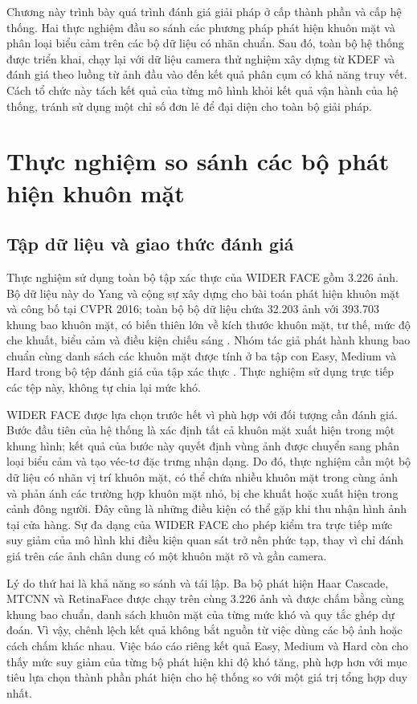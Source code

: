 \documentclass[../LuanVan.tex]{subfiles}
\begin{document}
Chương này trình bày quá trình đánh giá giải pháp ở cấp thành phần và cấp hệ thống. Hai thực nghiệm đầu so sánh các phương pháp phát hiện khuôn mặt và phân loại biểu cảm trên các bộ dữ liệu có nhãn chuẩn. Sau đó, toàn bộ hệ thống được triển khai, chạy lại với dữ liệu camera thử nghiệm xây dựng từ KDEF và đánh giá theo luồng từ ảnh đầu vào đến kết quả phân cụm có khả năng truy vết. Cách tổ chức này tách kết quả của từng mô hình khỏi kết quả vận hành của hệ thống, tránh sử dụng một chỉ số đơn lẻ để đại diện cho toàn bộ giải pháp.

\section{Thực nghiệm so sánh các bộ phát hiện khuôn mặt}
\label{section:5.1}

\subsection{Tập dữ liệu và giao thức đánh giá}
\label{subsection:5.1.1}

Thực nghiệm sử dụng toàn bộ tập xác thực của WIDER FACE gồm 3.226 ảnh. Bộ dữ liệu này do Yang và cộng sự xây dựng cho bài toán phát hiện khuôn mặt và công bố tại CVPR 2016; toàn bộ bộ dữ liệu chứa 32.203 ảnh với 393.703 khung bao khuôn mặt, có biến thiên lớn về kích thước khuôn mặt, tư thế, mức độ che khuất, biểu cảm và điều kiện chiếu sáng \cite{yang2016wider}. Nhóm tác giả phát hành khung bao chuẩn cùng danh sách các khuôn mặt được tính ở ba tập con Easy, Medium và Hard trong bộ tệp đánh giá của tập xác thực \cite{widerFaceEvaluation}. Thực nghiệm sử dụng trực tiếp các tệp này, không tự chia lại mức khó.

WIDER FACE được lựa chọn trước hết vì phù hợp với đối tượng cần đánh giá. Bước đầu tiên của hệ thống là xác định tất cả khuôn mặt xuất hiện trong một khung hình; kết quả của bước này quyết định vùng ảnh được chuyển sang phân loại biểu cảm và tạo véc-tơ đặc trưng nhận dạng. Do đó, thực nghiệm cần một bộ dữ liệu có nhãn vị trí khuôn mặt, có thể chứa nhiều khuôn mặt trong cùng ảnh và phản ánh các trường hợp khuôn mặt nhỏ, bị che khuất hoặc xuất hiện trong cảnh đông người. Đây cũng là những điều kiện có thể gặp khi thu nhận hình ảnh tại cửa hàng. Sự đa dạng của WIDER FACE cho phép kiểm tra trực tiếp mức suy giảm của mô hình khi điều kiện quan sát trở nên phức tạp, thay vì chỉ đánh giá trên các ảnh chân dung có một khuôn mặt rõ và gần camera.

Lý do thứ hai là khả năng so sánh và tái lập. Ba bộ phát hiện Haar Cascade, MTCNN và RetinaFace được chạy trên cùng 3.226 ảnh và được chấm bằng cùng khung bao chuẩn, danh sách khuôn mặt của từng mức khó và quy tắc ghép dự đoán. Vì vậy, chênh lệch kết quả không bắt nguồn từ việc dùng các bộ ảnh hoặc cách chấm khác nhau. Việc báo cáo riêng kết quả Easy, Medium và Hard còn cho thấy mức suy giảm của từng bộ phát hiện khi độ khó tăng, phù hợp hơn với mục tiêu lựa chọn thành phần phát hiện cho hệ thống so với một giá trị tổng hợp duy nhất.
\end{document}
